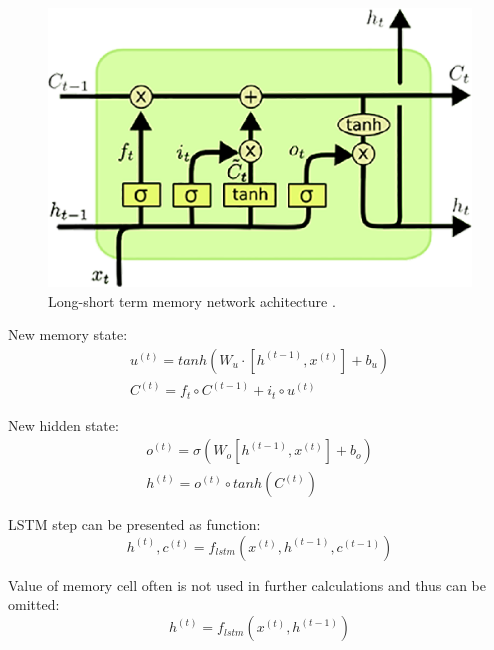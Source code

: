 \begin{figure}[h]
\centering
\includegraphics{Figures/lstm}
\decoRule
\caption[Long-short term memory]{Long-short term memory network achitecture \parencite{lstm-picture}.}
\label{fig:word_embeddings}
\end{figure}

New memory state:
\begin{equation}
\begin{gathered}
u^{(t)} = tanh(W_u\cdot[h^{(t-1)}, x^{(t)}]+b_u) \\

C^{(t)} = f_t\circ C^{(t-1)}+i_t\circ u^{(t)}
\end{gathered}
\label{lstm:c}
\end{equation} 

New hidden state:
\begin{equation}
\begin{gathered}
o^{(t)}=\sigma(W_o[h^{(t-1)},x^{(t)}]+b_o) \\

h^{(t)}=o^{(t)}\circ tanh(C^{(t)})
\end{gathered}
\label{lstm:h}
\end{equation} 

LSTM step can be presented as function:
\begin{equation}
h^{(t)}, c^{(t)} = f_{lstm}(x^{(t)}, h^{(t-1)}, c^{(t-1)})
\end{equation}

Value of memory cell often is not used in further calculations and thus can be omitted:
\begin{equation}
h^{(t)} = f_{lstm}(x^{(t)}, h^{(t-1)})
\end{equation}

